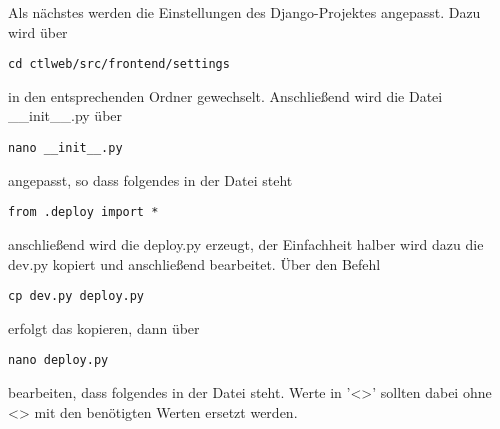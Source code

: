 Als nächstes werden die Einstellungen des Django-Projektes angepasst. Dazu
wird über
\begin{lstlisting}
cd ctlweb/src/frontend/settings
\end{lstlisting}
in den entsprechenden Ordner gewechselt. Anschließend wird die Datei
\_\_init\_\_.py über 
\begin{lstlisting}
nano __init__.py
\end{lstlisting}
angepasst, so dass folgendes in der Datei steht
\begin{lstlisting}
from .deploy import *
\end{lstlisting}
anschließend wird die deploy.py erzeugt, der Einfachheit halber wird dazu die
dev.py kopiert und anschließend bearbeitet. Über den Befehl 
\begin{lstlisting}
cp dev.py deploy.py
\end{lstlisting}
erfolgt das kopieren, dann über 
\begin{lstlisting}
nano deploy.py
\end{lstlisting}
bearbeiten, dass folgendes in der Datei steht. Werte in '<>' sollten dabei ohne
<> mit den benötigten Werten ersetzt werden.
